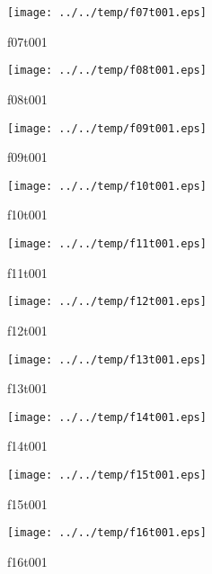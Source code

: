 \documentclass[a4paper,twoside,11pt]{article}
\makeatletter
\def\maxwidth{%
  \ifdim\Gin@nat@width>\linewidth
    \linewidth
  \else
    \Gin@nat@width
  \fi
}
\makeatother
\begin{document}
\clearpage
\begin{figure}
  \centering
  \texttt{[image: ../../temp/f07t001.eps]}
  \caption{f07t001}
  \label{fig:f07t001}
\end{figure}

\begin{figure}
  \centering
  \texttt{[image: ../../temp/f08t001.eps]}
  \caption{f08t001}
  \label{fig:f08t001}
\end{figure}

\clearpage
\begin{figure}
  \centering
  \texttt{[image: ../../temp/f09t001.eps]}
  \caption{f09t001}
  \label{fig:f09t001}
\end{figure}

\begin{figure}
  \centering
  \texttt{[image: ../../temp/f10t001.eps]}
  \caption{f10t001}
  \label{fig:f10t001}
\end{figure}

\clearpage
\begin{figure}
  \centering
  \texttt{[image: ../../temp/f11t001.eps]}
  \caption{f11t001}
  \label{fig:f11t001}
\end{figure}

\begin{figure}
  \centering
  \texttt{[image: ../../temp/f12t001.eps]}
  \caption{f12t001}
  \label{fig:f12t001}
\end{figure}

\clearpage
\begin{figure}
  \centering
  \texttt{[image: ../../temp/f13t001.eps]}
  \caption{f13t001}
  \label{fig:f13t001}
\end{figure}

\begin{figure}
  \centering
  \texttt{[image: ../../temp/f14t001.eps]}
  \caption{f14t001}
  \label{fig:f14t001}
\end{figure}

\clearpage
\begin{figure}
  \centering
  \texttt{[image: ../../temp/f15t001.eps]}
  \caption{f15t001}
  \label{fig:f15t001}
\end{figure}

\begin{figure}
  \centering
  \texttt{[image: ../../temp/f16t001.eps]}
  \caption{f16t001}
  \label{fig:f16t001}
\end{figure}
\end{document}
